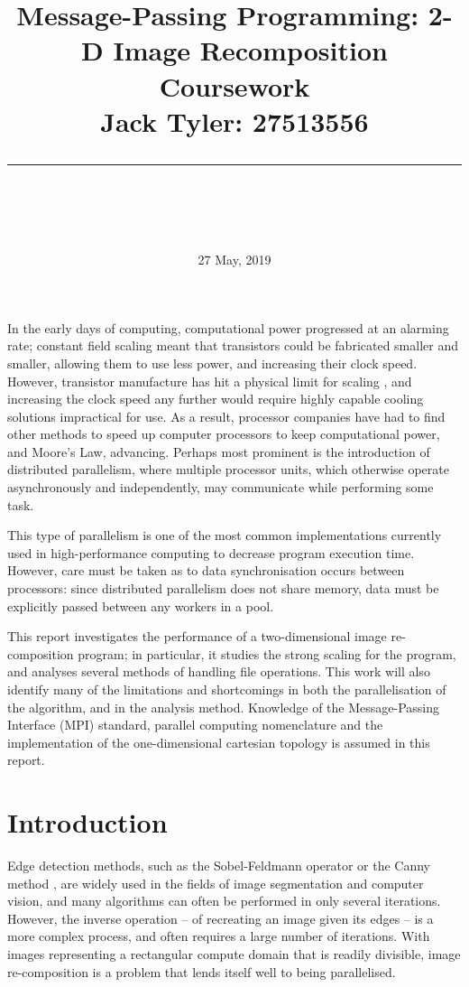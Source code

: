 \documentclass{article} %
\title{\raggedright
\normalfont \normalsize 
\huge Message-Passing Programming: 2-D Image Recomposition Coursework \\[1em]
\normalsize \normalfont Jack Tyler: 27513556 \\
\rule{\linewidth}{.5pt}  \\[6pt]
}
\date{27 May, 2019}
\begin{document}
\maketitle

In the early days of computing, computational power progressed at an alarming rate; constant field scaling meant that transistors could be fabricated smaller and smaller, allowing them to use less power, and increasing their clock speed.
However, transistor manufacture has hit a physical limit for scaling \citep{Mcfarland1995}, and increasing the clock speed any further would require highly capable cooling solutions impractical for use.
As a result, processor companies have had to find other methods to speed up computer processors to keep computational power, and Moore's Law, advancing.
Perhaps most prominent is the introduction of distributed parallelism, where multiple processor units, which otherwise operate asynchronously and independently, may communicate while performing some task.

This type of parallelism is one of the most common implementations currently used in high-performance computing to decrease program execution time.
However, care must be taken as to data synchronisation occurs between processors: since distributed parallelism does not share memory, data must be explicitly passed between any workers in a pool.

This report investigates the performance of a two-dimensional image re-composition program; in particular, it studies the strong scaling for the program, and analyses several methods of handling file operations. 
This work will also identify many of the limitations and shortcomings in both the parallelisation of the algorithm, and in the analysis method.
Knowledge of the Message-Passing Interface (MPI) standard, parallel computing nomenclature and the implementation of the one-dimensional cartesian topology is assumed in this report.

\section*{Introduction}

Edge detection methods, such as the Sobel-Feldmann operator \citep{sobel} or the Canny method \citep{canny}, are widely used in the fields of image segmentation and computer vision, and many algorithms can often be performed in only several iterations.
However, the inverse operation -- of recreating an image given its edges -- is a more complex process, and often requires a large number of iterations.
With images representing a rectangular compute domain that is readily divisible, image re-composition is a problem that lends itself well to being parallelised.
\end{document}
